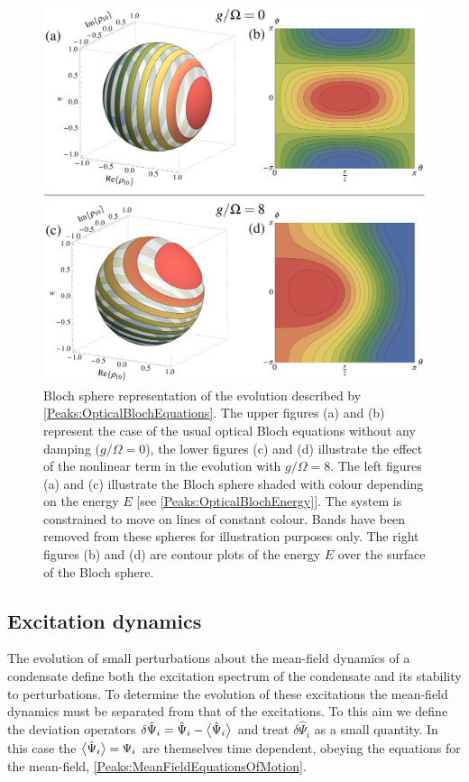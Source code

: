 \begin{figure}
    \centering
    \includegraphics[width=14cm]{BlochSpheres}
    \caption{Bloch sphere representation of the evolution described by \eqref{Peaks:OpticalBlochEquations}. The upper figures (a) and (b) represent the case of the usual optical Bloch equations without any damping ($g/\Omega=0$), the lower figures (c) and (d) illustrate the effect of the nonlinear term in the evolution with $g/\Omega = 8$. The left figures (a) and (c) illustrate the Bloch sphere shaded with colour depending on the energy $E$ [see \eqref{Peaks:OpticalBlochEnergy}]. The system is constrained to move on lines of constant colour. Bands have been removed from these spheres for illustration purposes only. The right figures (b) and (d) are contour plots of the energy $E$ over the surface of the Bloch sphere.
     \label{Peaks:BlochSphere}}
\end{figure}

\subsection{Excitation dynamics}

The evolution of small perturbations about the mean-field dynamics of a condensate define both the excitation spectrum of the condensate and its stability to perturbations. 
To determine the evolution of these excitations the mean-field dynamics must be separated from that of the excitations. To this aim we define the deviation operators $\delta\hat{\Psi}_i = \hat{\Psi}_i - \big<\hat{\Psi}_i\big>$ and treat $\delta\hat{\Psi}_i$ as a small quantity. In this case the $\big<\hat{\Psi}_i\big>=\Psi_i$ are themselves time dependent, obeying the equations for the mean-field, \eqref{Peaks:MeanFieldEquationsOfMotion}.

